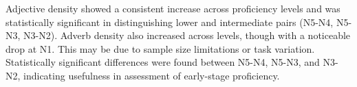 Adjective density showed a consistent increase across proficiency levels and was statistically significant in
distinguishing lower and intermediate pairs (N5-N4, N5-N3, N3-N2). Adverb density also increased across levels, though with a noticeable drop at N1. This may be due to sample size
limitations or task variation. Statistically significant differences were found between N5-N4, N5-N3, and N3-N2,
indicating usefulness in assessment of early-stage proficiency.

